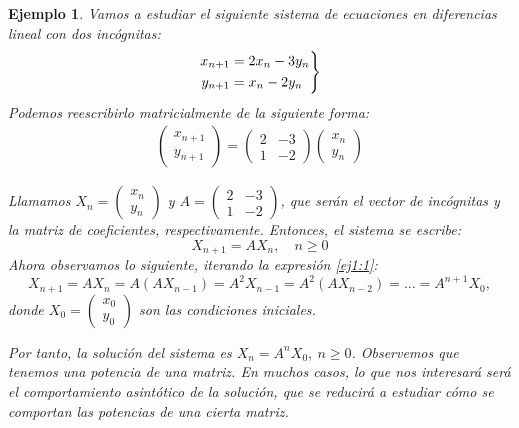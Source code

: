 \documentclass[11pt, a4paper]{article}
\newif\IfInSansMode
\numberwithin{equation}{section}
\theoremstyle{theorem-style}
\theoremstyle{definition-style}
\theoremstyle{remark-style}
\theoremstyle{example-style}
\newtheorem{ejemplo}{Ejemplo}[section]
\newenvironment{rcases}
  {\left.\begin{aligned}}
  {\end{aligned}\right\rbrace}
\begin{document}
\begin{ejemplo}
Vamos a estudiar el siguiente sistema de ecuaciones en diferencias lineal con dos incógnitas:
  $$\begin{rcases}
    x_{n+1} &= 2x_n - 3y_n \\
    y_{n+1} &= x_n - 2y_n
  \end{rcases}$$
Podemos reescribirlo matricialmente de la siguiente forma:
  \begin{align*} 
    \left(
    \begin{array}{c}
      x_{n+1} \\
      y_{n+1}
    \end{array} \right)
    = \left(
    \begin{array}{cc}
      2 & -3 \\
      1 & -2
    \end{array} \right) \left(
          \begin{array}{c}
            x_n \\
            y_n
          \end{array}
    \right)
  \end{align*}

  Llamamos $X_n =
  \begin{pmatrix}
    x_n \\
    y_n
  \end{pmatrix}$ y $A =
  \begin{pmatrix}
    2 & -3 \\
    1 & -2
  \end{pmatrix}$, que serán el \textit{vector de incógnitas} y la \textit{matriz de coeficientes}, respectivamente. Entonces, el sistema se escribe:
  \begin{equation} \label{ej1:1}
	X_{n+1} = AX_n,\quad n \ge 0
\end{equation}
  Ahora observamos lo siguiente, iterando la expresión \eqref{ej1:1}:
  $$X_{n+1} = AX_n = A(AX_{n-1}) = A^2X_{n-1} = A^2(AX_{n-2}) = \hdots =
  A^{n+1}X_0,$$ donde $X_0 = 
  \begin{pmatrix}
    x_0 \\
    y_0
  \end{pmatrix}$ son las condiciones iniciales.

  Por tanto, la solución del sistema es $X_n = A^nX_0, \ n \geq 0$. Observemos que tenemos una potencia de una matriz. En muchos casos, lo que nos interesará será el comportamiento asintótico de la solución, que se reducirá a estudiar cómo se comportan las potencias de una cierta matriz.

\end{ejemplo}
\end{document}
